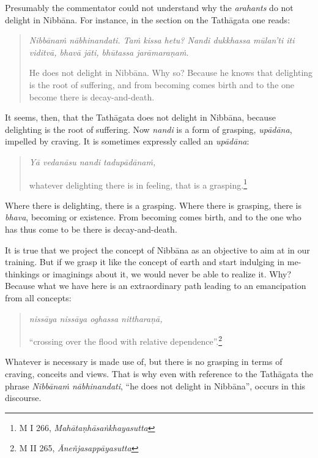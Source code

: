 Presumably the commentator could not understand why the \emph{arahants} do not delight in Nibbāna. For instance, in the section on the Tathāgata one reads:

\begin{quote}
\emph{Nibbānaṁ nābhinandati. Taṁ kissa hetu? Nandi dukkhassa mūlan'ti iti viditvā, bhavā jāti, bhūtassa jarāmaraṇaṁ.}

He does not delight in Nibbāna. Why so? Because he knows that delighting is the root of suffering, and from becoming comes birth and to the one become there is decay-and-death.
\end{quote}

It seems, then, that the Tathāgata does not delight in Nibbāna, because delighting is the root of suffering. Now \emph{nandi} is a form of grasping, \emph{upādāna}, impelled by craving. It is sometimes expressly called an \emph{upādāna}:

\begin{quote}
\emph{Yā vedanāsu nandi tadupādānaṁ,}

whatever delighting there is in feeling, that is a grasping.\footnote{M I 266, \emph{Mahātaṇhāsaṅkhayasutta}}
\end{quote}

Where there is delighting, there is a grasping. Where there is grasping, there is \emph{bhava}, becoming or existence. From becoming comes birth, and to the one who has thus come to be there is decay-and-death.

It is true that we project the concept of Nibbāna as an objective to aim at in our training. But if we grasp it like the concept of earth and start indulging in me-thinkings or imaginings about it, we would never be able to realize it. Why? Because what we have here is an extraordinary path leading to an emancipation from all concepts:

\clearpage

\begin{quote}
\emph{nissāya nissāya oghassa nittharaṇā,}

``crossing over the flood with relative dependence''.\footnote{M II 265, \emph{Āneñjasappāyasutta}}
\end{quote}

Whatever is necessary is made use of, but there is no grasping in terms of craving, conceits and views. That is why even with reference to the Tathāgata the phrase \emph{Nibbānaṁ nābhinandati}, ``he does not delight in Nibbāna'', occurs in this discourse.

